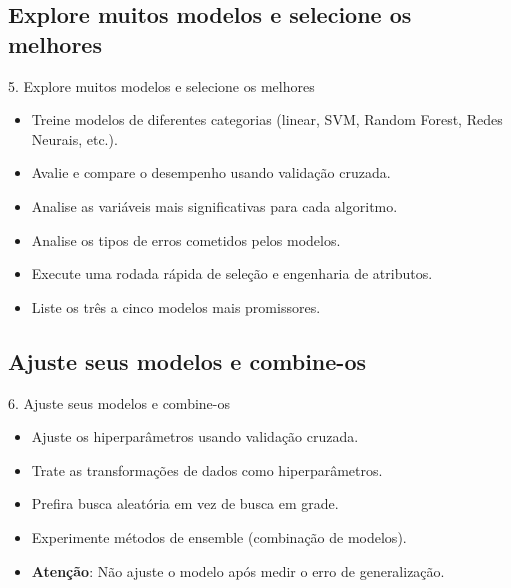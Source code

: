 \documentclass{beamer}
\begin{document}
\subsection{Explore muitos modelos e selecione os melhores}
\begin{frame}{5. Explore muitos modelos e selecione os melhores}
    \begin{itemize}
        \item Treine modelos de diferentes categorias (linear, SVM, Random Forest, Redes Neurais, etc.).
        \item Avalie e compare o desempenho usando validação cruzada.
        \item Analise as variáveis mais significativas para cada algoritmo.
        \item Analise os tipos de erros cometidos pelos modelos.
        \item Execute uma rodada rápida de seleção e engenharia de atributos.
        \item Liste os três a cinco modelos mais promissores.
    \end{itemize}
\end{frame}

\subsection{Ajuste seus modelos e combine-os}
\begin{frame}{6. Ajuste seus modelos e combine-os}
    \begin{itemize}
        \item Ajuste os hiperparâmetros usando validação cruzada.
        \item Trate as transformações de dados como hiperparâmetros.
        \item Prefira busca aleatória em vez de busca em grade.
        \item Experimente métodos de ensemble (combinação de modelos).
        \item \textbf{Atenção}: Não ajuste o modelo após medir o erro de generalização.
    \end{itemize}
\end{frame}
\end{document}
